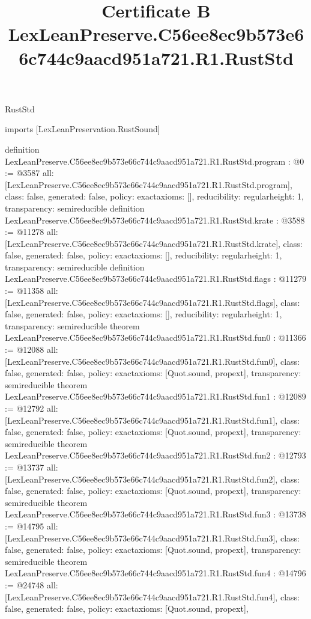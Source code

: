 \begin{lexlean}{RustStd}
\title{Certificate B LexLeanPreserve.C56ee8ec9b573e66c744c9aacd951a721.R1.RustStd}
\begin{coremodule}
imports [LexLeanPreservation.RustSound]

definition LexLeanPreserve.C56ee8ec9b573e66c744c9aacd951a721.R1.RustStd.program : @0 := @3587 {
  all: [LexLeanPreserve.C56ee8ec9b573e66c744c9aacd951a721.R1.RustStd.program],
  class: false,
  generated: false,
  policy: exact{axioms: []},
  reducibility: regular{height: 1},
  transparency: semireducible
}
definition LexLeanPreserve.C56ee8ec9b573e66c744c9aacd951a721.R1.RustStd.krate : @3588 := @11278 {
  all: [LexLeanPreserve.C56ee8ec9b573e66c744c9aacd951a721.R1.RustStd.krate],
  class: false,
  generated: false,
  policy: exact{axioms: []},
  reducibility: regular{height: 1},
  transparency: semireducible
}
definition LexLeanPreserve.C56ee8ec9b573e66c744c9aacd951a721.R1.RustStd.flags : @11279 := @11358 {
  all: [LexLeanPreserve.C56ee8ec9b573e66c744c9aacd951a721.R1.RustStd.flags],
  class: false,
  generated: false,
  policy: exact{axioms: []},
  reducibility: regular{height: 1},
  transparency: semireducible
}
theorem LexLeanPreserve.C56ee8ec9b573e66c744c9aacd951a721.R1.RustStd.fun0 : @11366 := @12088 {
  all: [LexLeanPreserve.C56ee8ec9b573e66c744c9aacd951a721.R1.RustStd.fun0],
  class: false,
  generated: false,
  policy: exact{axioms: [Quot.sound, propext]},
  transparency: semireducible
}
theorem LexLeanPreserve.C56ee8ec9b573e66c744c9aacd951a721.R1.RustStd.fun1 : @12089 := @12792 {
  all: [LexLeanPreserve.C56ee8ec9b573e66c744c9aacd951a721.R1.RustStd.fun1],
  class: false,
  generated: false,
  policy: exact{axioms: [Quot.sound, propext]},
  transparency: semireducible
}
theorem LexLeanPreserve.C56ee8ec9b573e66c744c9aacd951a721.R1.RustStd.fun2 : @12793 := @13737 {
  all: [LexLeanPreserve.C56ee8ec9b573e66c744c9aacd951a721.R1.RustStd.fun2],
  class: false,
  generated: false,
  policy: exact{axioms: [Quot.sound, propext]},
  transparency: semireducible
}
theorem LexLeanPreserve.C56ee8ec9b573e66c744c9aacd951a721.R1.RustStd.fun3 : @13738 := @14795 {
  all: [LexLeanPreserve.C56ee8ec9b573e66c744c9aacd951a721.R1.RustStd.fun3],
  class: false,
  generated: false,
  policy: exact{axioms: [Quot.sound, propext]},
  transparency: semireducible
}
theorem LexLeanPreserve.C56ee8ec9b573e66c744c9aacd951a721.R1.RustStd.fun4 : @14796 := @24748 {
  all: [LexLeanPreserve.C56ee8ec9b573e66c744c9aacd951a721.R1.RustStd.fun4],
  class: false,
  generated: false,
  policy: exact{axioms: [Quot.sound, propext]},
}
\end{coremodule}
\end{lexlean}
